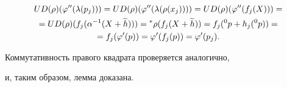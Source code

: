 \begin{pf}
\begin{gather*}


UD(\rho)(\f''(\lambda(p_j))) =


UD(\rho)(\f''(\lambda(\rho(x_j))))= UD(\rho)(\f''(f_j(X)))= \\


%


= UD(\rho)(f_j(\alpha^{-1}(X+\widetilde h)))=


{}^{\ast}\rho(f_j(X+\widetilde h))= f_j({}^0 p + h_j({}^0 p)) = \\


%


= f_j(\f'(p))=\f'(f_j(p))=\f'(p_j).


\end{gather*}


Коммутативность правого квадрата проверяется аналогично,


и, таким образом, лемма доказана.


\end{pf}





